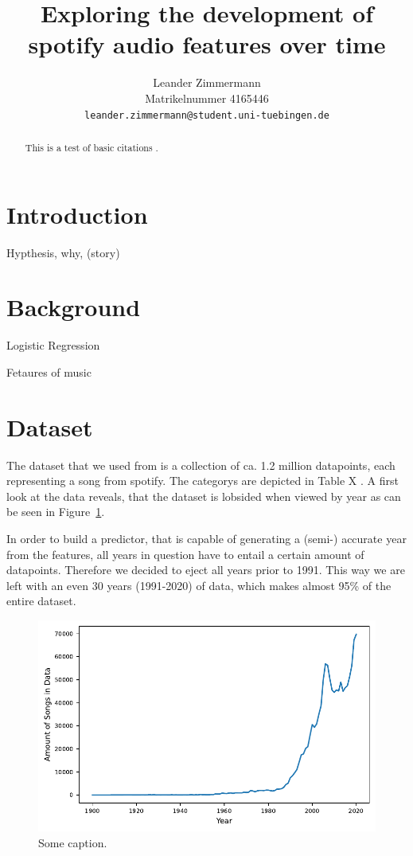 \documentclass{article}
\title{Exploring the development of spotify audio features over time}
\author{%
  Leander Zimmermann\\
  Matrikelnummer 4165446\\
  \texttt{leander.zimmermann@student.uni-tuebingen.de} \\
}
\begin{document}
\maketitle

\begin{abstract}
  This is a test of basic citations \citet{dataset}.
\end{abstract}

\section{Introduction}
Hypthesis, why, (story)
\section{Background}
Logistic Regression

Fetaures of music
\section{Dataset}
The dataset that we used from \citet{dataset} is a collection of ca. 1.2 million datapoints, each representing a song from spotify. The categorys are depicted in Table X \answerTODO{}. A first look at the data reveals, that the dataset is lobsided when viewed by year as can be seen in Figure~\ref{fig:data_spread}.

In order to build a predictor, that is capable of generating a (semi-) accurate year from the features, all years in question have to entail a certain amount of datapoints. Therefore we decided to eject all years prior to 1991. This way we are left with an even 30 years (1991-2020) of data, which makes almost 95\% of the entire dataset.

\begin{figure}[t]
  \label{fig:data_spread}
  \centering
  \includegraphics{data_spread}
  \caption{Some caption.}
\end{figure}
\end{document}
